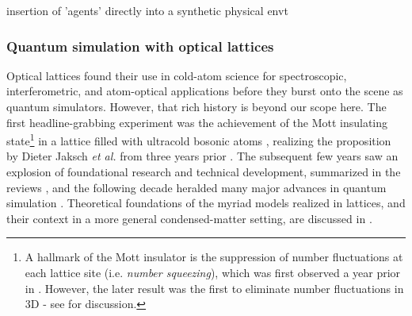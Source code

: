
	insertion of 'agents' directly into a synthetic physical envt

\subsubsection{Quantum simulation with optical lattices}

	Optical lattices found their use in cold-atom science for spectroscopic, interferometric, and atom-optical applications before they burst onto the scene as quantum simulators.
	However, that rich history is beyond our scope here.
	The first headline-grabbing experiment was the achievement of the Mott insulating state\footnote{A hallmark of the Mott insulator is the suppression of number fluctuations at each lattice site (i.e.
	\emph{number squeezing}), which was first observed a year prior in \cite{orzel01}.
	However, the later result was the first to eliminate number fluctuations in 3D - see \cite{morsch06} for discussion.} in a lattice filled with ultracold bosonic atoms \cite{greiner02}, realizing the proposition by Dieter Jaksch \emph{et al.} from three years prior \cite{jaksch98}.
	 The subsequent few years saw an explosion of foundational research and technical development, summarized in the reviews \cite{morsch06,bloch08}, and the following decade heralded many major advances in quantum simulation \cite{bloch12,gross17}.
	Theoretical foundations of the myriad models realized in lattices, and their context in a more general condensed-matter setting, are discussed in \cite{LewensteinLattices, lewenstein07}.

